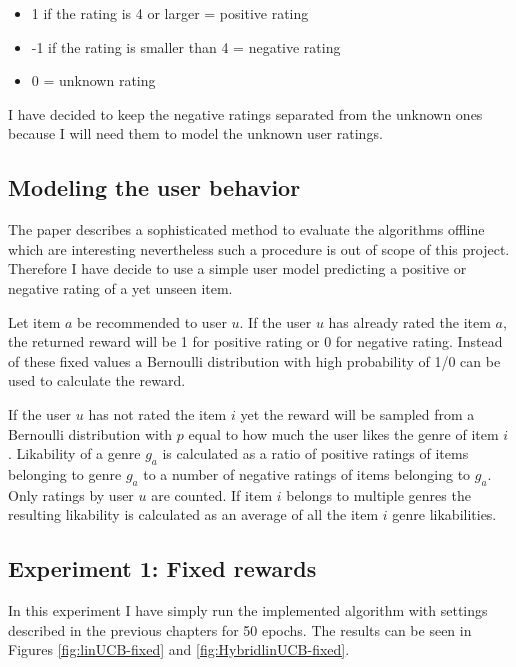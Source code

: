 \documentclass[12pt, titlepage]{article}
\begin{document}
\begin{itemize}
\item 1 if the rating is 4 or larger = positive rating
\item -1 if the rating is smaller than 4 = negative rating
\item 0 = unknown rating
\end{itemize}

I have decided to keep the negative ratings separated from the unknown ones because I will need them to model the unknown user ratings.

\subsection{Modeling the user behavior}
The paper describes a sophisticated method to evaluate the algorithms offline which are interesting nevertheless such a procedure is out of scope of this project. Therefore I have decide to use a simple user model predicting a positive or negative rating of a yet unseen item.

Let item $a$ be recommended to user $u$.
If the user $u$ has already rated the item $a$, the returned reward will be 1 for positive rating or 0 for negative rating. Instead of these fixed values a Bernoulli distribution with high probability of 1/0 can be used to calculate the reward.

If the user $u$ has not rated the item $i$  yet the reward will be sampled from a Bernoulli distribution with $p$ equal to how much the user likes the genre of item $i$. Likability of a genre $g_a$ is calculated as a ratio of positive ratings of items belonging to genre $g_a$ to a number of negative ratings of items belonging to $g_a$. Only ratings by user $u$ are counted. If item $i$ belongs to multiple genres the resulting likability is calculated as an average of all the item $i$ genre likabilities.

\subsection{Experiment 1: Fixed rewards}
In this experiment I have simply run the implemented algorithm with settings described in the previous chapters for 50 epochs. The results can be seen in Figures \ref{fig:linUCB-fixed} and \ref{fig:HybridlinUCB-fixed}. 
\end{document}
